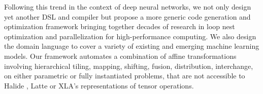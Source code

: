 Following this trend in the context of deep neural networks, we not only
design yet another DSL and compiler but propose a more generic code generation
and optimization framework bringing together decades of research in loop nest
optimization and parallelization for high-performance computing. We also
design the domain language to cover a variety of existing and emerging machine
learning models.
Our framework automates a combination of affine transformations involving
hierarchical tiling, mapping, shifting, fusion, distribution, interchange, on
either parametric or fully instantiated problems, that are not accessible to
Halide \cite{Halide,Mullapudi2016HalideAutoscheduler}, Latte \cite{Latte} or
XLA's \cite{XLA} representations of tensor operations.


